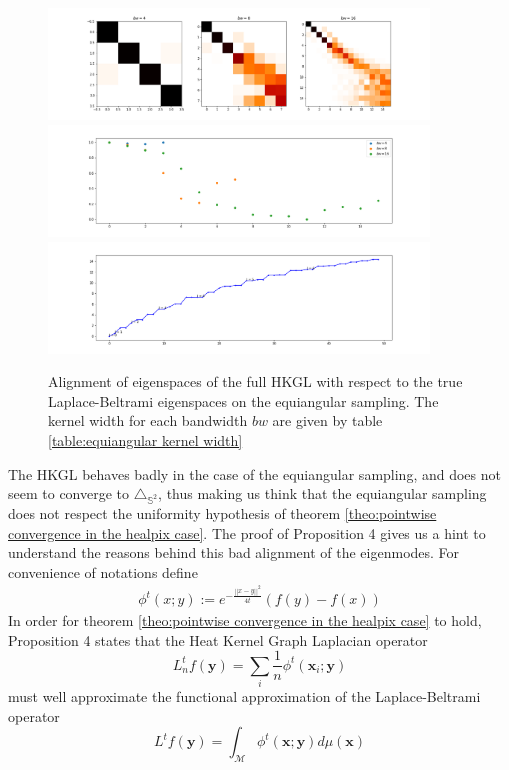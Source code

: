 \begin{figure}[h!]
	\centering
	\includegraphics[width=0.9\textwidth]{../codes/02.HeatKernelGraphLaplacian/equiangular/equi_full.png}
	\includegraphics[width=0.9\textwidth]{../codes/02.HeatKernelGraphLaplacian/equiangular/equi_full_diagonal.png}
	\includegraphics[width=0.9\textwidth]{../codes/02.HeatKernelGraphLaplacian/equiangular/equi_full_eigenvalues_16.png}
	\caption{\label{fig:equiangular sampling alignment}Alignment of eigenspaces of the full HKGL with respect to the true Laplace-Beltrami eigenspaces on the equiangular sampling. The kernel width for each bandwidth $bw$ are given by table \ref{table:equiangular kernel width}}
\end{figure}
The HKGL behaves badly in the case of the equiangular sampling, and does not seem to converge to $\triangle_{\mathbb S^2}$, thus making us think that the equiangular sampling does not respect the uniformity hypothesis of theorem \ref{theo:pointwise convergence in the healpix case}. The proof of Proposition 4 gives us a hint to understand the reasons behind this bad alignment of the eigenmodes. For convenience of notations define 
\begin{align*}
	\phi^{t}(x ; y):=e^{-\frac{||x-y||^2}{4t}}\left(f(y)-f(x)\right)
\end{align*}
 In order for theorem \ref{theo:pointwise convergence in the healpix case} to hold, Proposition 4 states that the Heat Kernel Graph Laplacian operator $$L_n^tf(\mathbf y)=\sum_i \frac{1}{n} \phi^{t}(\mathbf x_i ; \mathbf y)$$ must well approximate the functional approximation of the Laplace-Beltrami operator $$L^tf(\mathbf y)=\int_\mathcal M\phi^{t}(\mathbf x ; \mathbf y)d\mu(\mathbf x)$$

